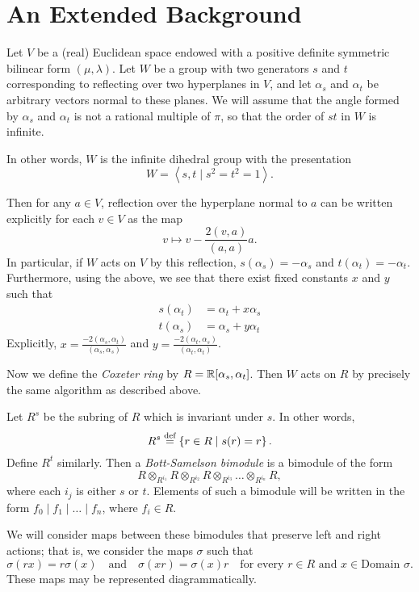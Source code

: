 \appendix


\section{An Extended Background}
\label{sec:prelim_background}
Let $V$ be a (real) Euclidean space endowed with a positive definite symmetric bilinear form $(\mu, \lambda)$.
Let $W$ be a group with two generators $s$ and $t$ corresponding to reflecting over two hyperplanes in $V$, and let $\alpha_s$ and $\alpha_t$ be arbitrary vectors normal to these planes.  We will assume that the angle formed by $\alpha_s$ and $\alpha_t$ is not a rational multiple of $\pi$, so that the order of $st$ in $W$ is infinite.  

In other words, $W$ is the infinite dihedral group with the presentation \[ W = \left<s,t \mid s^2=t^2=1\right>. \] 

Then for any $a \in V$, reflection over the hyperplane normal to $a$ can be written explicitly for each $v \in V$ as the map \[ v \mapsto v - \frac{2(v,a)}{(a,a)} a. \]  
In particular, if $W$ acts on $V$ by this reflection, $s(\alpha_s) = -\alpha_s$ and $t(\alpha_t) = -\alpha_t$.  Furthermore, using the above, we see that there exist fixed constants $x$ and $y$ such that
\begin{align*}
	s(\alpha_t) &= \alpha_t + x \alpha_s \\
	t(\alpha_s) &= \alpha_s + y \alpha_t
\end{align*}
Explicitly, $x = \frac{-2(\alpha_s,\alpha_t)}{(\alpha_s, \alpha_s)}$ and $y = \frac{-2(\alpha_t,\alpha_s)}{(\alpha_t,\alpha_t)}$.  

Now we define the \emph{Coxeter ring} by $R = \mathbb R[\alpha_s, \alpha_t]$.  Then $W$ acts on $R$ by precisely the same algorithm as described above.

Let $R^s$ be the subring of $R$ which is invariant under $s$.  In other words,
\[ R^s \stackrel{\text{def}}{=} \left\{ r \in R \mid s(r) = r \right\}. \]
Define $R^t$ similarly.  Then a \emph{Bott-Samelson bimodule} is a bimodule of the form
\[ R \otimes_{R^{i_1}} R \otimes_{R^{i_2}} R \otimes_{R^{i_3}} \dots \otimes_{R^{i_n}} R, \]
where each $i_j$ is either $s$ or $t$.   Elements of such a bimodule will be written in the form $f_0 \mid f_1 \mid \dots \mid f_n$, where $f_i \in R$.

We will consider maps between these bimodules that preserve left and right actions; that is, we consider the maps $\sigma$ such that
\begin{equation}
	\sigma(rx) = r\sigma(x) \quad\text{and}\quad \sigma(xr) = \sigma(x)r \quad\text{for every $r \in R$ and $x \in \text{Domain } \sigma$}.
	\label{eq:respect}
\end{equation}
These maps may be represented diagrammatically.

